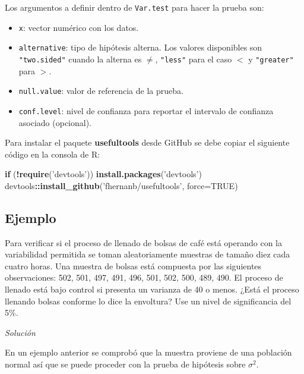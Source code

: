 \documentclass[10pt,]{krantz}
\makeatletter
\newenvironment{Shaded}{\begin{snugshade}}{\end{snugshade}}
\newcommand{\KeywordTok}[1]{\textcolor[rgb]{0.13,0.29,0.53}{\textbf{#1}}}
\newcommand{\DataTypeTok}[1]{\textcolor[rgb]{0.13,0.29,0.53}{#1}}
\newcommand{\StringTok}[1]{\textcolor[rgb]{0.31,0.60,0.02}{#1}}
\newcommand{\OtherTok}[1]{\textcolor[rgb]{0.56,0.35,0.01}{#1}}
\newcommand{\ControlFlowTok}[1]{\textcolor[rgb]{0.13,0.29,0.53}{\textbf{#1}}}
\newcommand{\OperatorTok}[1]{\textcolor[rgb]{0.81,0.36,0.00}{\textbf{#1}}}
\newcommand{\NormalTok}[1]{#1}
\providecommand{\tightlist}{%
  \setlength{\itemsep}{0pt}\setlength{\parskip}{0pt}}
\let\proglang=\textsf
\newenvironment{kframe}{%
\medskip{}
\setlength{\fboxsep}{.8em}
 \def\at@end@of@kframe{}%
 \ifinner\ifhmode%
  \def\at@end@of@kframe{\end{minipage}}%
  \begin{minipage}{\columnwidth}%
 \fi\fi%
 \def\FrameCommand##1{\hskip\@totalleftmargin \hskip-\fboxsep
 \colorbox{shadecolor}{##1}\hskip-\fboxsep
     \hskip-\linewidth \hskip-\@totalleftmargin \hskip\columnwidth}%
 \MakeFramed {\advance\hsize-\width
   \@totalleftmargin\z@ \linewidth\hsize
   \@setminipage}}%
 {\par\unskip\endMakeFramed%
 \at@end@of@kframe}
\renewenvironment{Shaded}{\begin{kframe}}{\end{kframe}}
\makeatother
\begin{document}
Los argumentos a definir dentro de \texttt{Var.test} para hacer la
prueba son:

\begin{itemize}
\tightlist
\item
  \texttt{x}: vector numérico con los datos.
\item
  \texttt{alternative}: tipo de hipótesis alterna. Los valores
  disponibles son \texttt{"two.sided"} cuando la alterna es \(\neq\),
  \texttt{"less"} para el caso \(<\) y \texttt{"greater"} para \(>\).
\item
  \texttt{null.value}: valor de referencia de la prueba.
\item
  \texttt{conf.level}: nivel de confianza para reportar el intervalo de
  confianza asociado (opcional).
\end{itemize}

Para instalar el paquete \textbf{usefultools} desde GitHub se debe
copiar el siguiente código en la consola de \proglang{R}:

\begin{Shaded}
\begin{Highlighting}[]
\ControlFlowTok{if}\NormalTok{ (}\OperatorTok{!}\KeywordTok{require}\NormalTok{(}\StringTok{'devtools'}\NormalTok{)) }\KeywordTok{install.packages}\NormalTok{(}\StringTok{'devtools'}\NormalTok{)}
\NormalTok{devtools}\OperatorTok{::}\KeywordTok{install_github}\NormalTok{(}\StringTok{'fhernanb/usefultools'}\NormalTok{, }\DataTypeTok{force=}\OtherTok{TRUE}\NormalTok{)}
\end{Highlighting}
\end{Shaded}

\subsection*{Ejemplo}\label{ejemplo-67}


Para verificar si el proceso de llenado de bolsas de café está operando
con la variabilidad permitida se toman aleatoriamente muestras de tamaño
diez cada cuatro horas. Una muestra de bolsas está compuesta por las
siguientes observaciones: 502, 501, 497, 491, 496, 501, 502, 500, 489,
490. El proceso de llenado está bajo control si presenta un varianza de
40 o menos. ¿Está el proceso llenando bolsas conforme lo dice la
envoltura? Use un nivel de significancia del 5\%.

\emph{Solución}

En un ejemplo anterior se comprobó que la muestra proviene de una
población normal así que se puede proceder con la prueba de hipótesis
sobre \(\sigma^2\).
\end{document}
